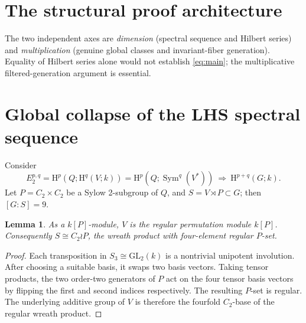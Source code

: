 \documentclass[11pt,a4paper]{article}
\newtheorem{lemma}[theorem]{Lemma}
\theoremstyle{remark}\newtheorem{remark}[theorem]{Remark}
\newcommand{\HH}{\mathrm H}
\newcommand{\Sym}{\operatorname{Sym}}
\begin{document}
\section{The structural proof architecture}
\begin{center}
\end{center}
The two independent axes are \emph{dimension} (spectral sequence and Hilbert series) and \emph{multiplication} (genuine global classes and invariant-fiber generation). Equality of Hilbert series alone would not establish \eqref{eq:main}; the multiplicative filtered-generation argument is essential.

\section{Global collapse of the LHS spectral sequence}\label{sec:collapse}
Consider
\begin{equation}\label{eq:lhs}
E_2^{p,q}=\HH^p\!\left(Q;\HH^q(V;k)\right)
=\HH^p\!\left(Q;\Sym^q(V^*)\right)
\ \Longrightarrow\ \HH^{p+q}(G;k).
\end{equation}
Let \(P=C_2\times C_2\) be a Sylow 2-subgroup of \(Q\), and \(S=V\rtimes P\subset G\); then \([G:S]=9\).

\begin{lemma}\label{lem:wreath}
As a \(k[P]\)-module, \(V\) is the regular permutation module \(k[P]\). Consequently \(S\cong C_2\wr P\), the wreath product with four-element regular \(P\)-set.
\end{lemma}
\begin{proof}
Each transposition in \(S_3\cong\mathrm{GL}_2(k)\) is a nontrivial unipotent involution. After choosing a suitable basis, it swaps two basis vectors. Taking tensor products, the two order-two generators of \(P\) act on the four tensor basis vectors by flipping the first and second indices respectively. The resulting \(P\)-set is regular. The underlying additive group of \(V\) is therefore the fourfold \(C_2\)-base of the regular wreath product.
\end{proof}
\end{document}
